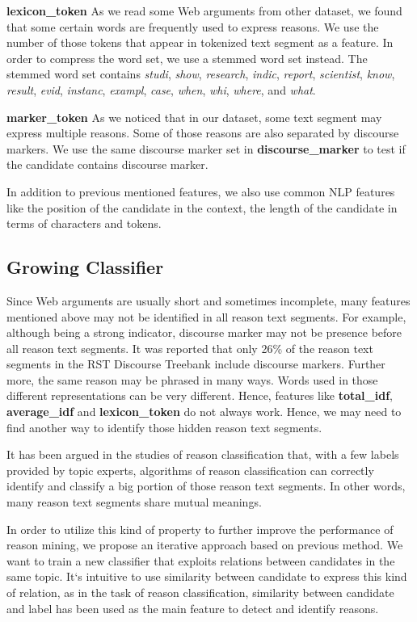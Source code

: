 \documentclass[11pt,a4paper]{article}
\begin{document}
{\bf lexicon\_token} As we read some Web arguments from other dataset, we found that some certain words are frequently used to express reasons. We use the number of those tokens that appear in tokenized text segment as a feature. In order to compress the word set, we use a stemmed word set instead. The stemmed word set contains {\it studi}, {\it show}, {\it research}, {\it indic}, {\it report}, {\it scientist}, {\it know}, {\it result}, {\it evid}, {\it instanc}, {\it exampl},  {\it case},  {\it when},  {\it whi},  {\it where}, and {\it what}.

{\bf marker\_token} As we noticed that in our dataset, some text segment may express multiple reasons. Some of those reasons are also separated by discourse markers. We use the same discourse marker set in {\bf discourse\_marker} to test if the candidate contains discourse marker.

In addition to previous mentioned features, we also use common NLP features like the position of the candidate in the context, the length of the candidate in terms of characters and tokens.


\subsection{Growing Classifier}

Since Web arguments are usually short and sometimes incomplete, many features mentioned above may not be identified in all reason text segments. For example, although being a strong indicator, discourse marker may not be presence before all reason text segments. It was reported that only 26\% of the reason text segments in the RST Discourse Treebank include discourse markers\cite{marcu2002unsupervised}. Further more, the same reason may be phrased in many ways. Words used in those different representations can be very different. Hence, features like {\bf total\_idf}, {\bf average\_idf} and {\bf lexicon\_token} do not always work. Hence, we may need to find another way to identify those hidden reason text segments. 

It has been argued in the studies of reason classification that, with a few labels provided by topic experts, algorithms of reason classification can correctly identify and classify a big portion of those reason text segments\cite{hasan2014you}. In other words, many reason text segments share mutual meanings. 

In order to utilize this kind of property to further improve the performance of reason mining, we propose an iterative approach based on previous method. We want to train a new classifier that exploits relations between candidates in the same topic. It`s intuitive to use similarity between candidate to express this kind of relation, as in the task of reason classification, similarity between candidate and label has been used as the main feature to detect and identify reasons\cite{hasan2014you}. 
\end{document}
